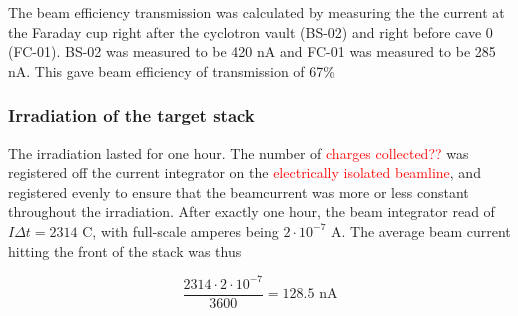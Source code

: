 \noindent
The beam efficiency transmission was calculated by measuring the the current at the Faraday cup right after the cyclotron vault (BS-02) and right before cave 0 (FC-01). BS-02 was measured to be 420 nA and FC-01 was measured to be 285 nA. This gave beam efficiency of transmission of 67\%



\subsubsection{Irradiation of the target stack} 
The irradiation lasted for one hour. The number of \textcolor{red}{charges collected??} was registered off the current integrator on the \textcolor{red}{electrically isolated beamline}, and registered evenly to ensure that the beamcurrent was more or less constant throughout the irradiation. After exactly one hour, the beam integrator read of $I\Delta t= 2314$ C, with full-scale amperes being $2\cdot10^{-7}$ A. The average beam current hitting the front of the stack was thus 

\begin{equation}
    \frac{2314\cdot 2\cdot10^{-7}}{3600 } = 128.5 \text{ nA}
\end{equation}

